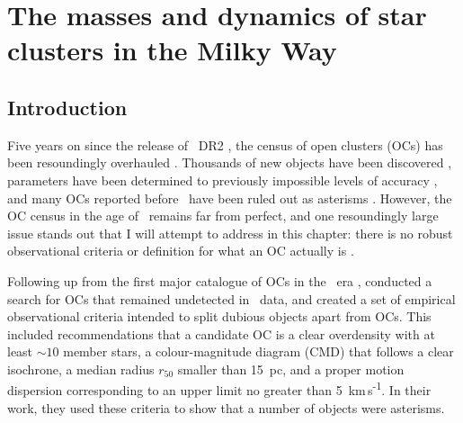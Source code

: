 %
\chapter{The masses and dynamics of star clusters in the Milky Way}
\label{sec:dynamics}




\section{Introduction}
\label{sec:dynamics:introduction}

Five years on since the release of \gaia\ DR2 \citep{brown_gaia_2018}, the census of open clusters (OCs) has been resoundingly overhauled \citep{cantat-gaudin_milky_2022}. Thousands of new objects have been discovered \citep[e.g.][]{liu_catalog_2019,castro-ginard_hunting_2020}, parameters have been determined to previously impossible levels of accuracy \citep[e.g.][]{bossini_age_2019,cantat-gaudin_painting_2020}, and many OCs reported before \gaia\ have been ruled out as asterisms \citep{cantat-gaudin_clusters_2020,piatti_assessing_2023,hunt_improving_open_2023}. However, the OC census in the age of \gaia\ remains far from perfect, and one resoundingly large issue stands out that I will attempt to address in this chapter: there is no robust observational criteria or definition for what an OC actually is \citep{hunt_improving_open_2023}.

Following up from the first major catalogue of OCs in the \gaia\ era \citep{cantat-gaudin_gaia_2018}, \citep{cantat-gaudin_clusters_2020} conducted a search for OCs that remained undetected in \gaia\ data, and created a set of empirical observational criteria intended to split dubious objects apart from OCs. This included recommendations that a candidate OC is a clear overdensity with at least $\sim10$ member stars, a colour-magnitude diagram (CMD) that follows a clear isochrone, a median radius $r_{50}$ smaller than 15~pc, and a proper motion dispersion corresponding to an upper limit no greater than 5~km\,s\textsuperscript{-1}. In their work, they used these criteria to show that a number of objects were asterisms.

